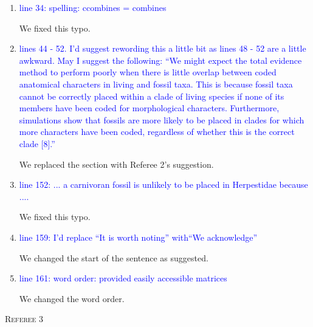 \documentclass[12pt,letterpaper]{article}
\renewcommand{\section}[1]{%
\bigskip
\begin{center}
\begin{Large}
\normalfont\scshape #1
\medskip
\end{Large}
\end{center}}
\begin{document}
\begin{enumerate}
\item{\textcolor{blue}{line 34: spelling: ccombines = combines}}

We fixed this typo.

\item{\textcolor{blue}{lines 44 - 52. I'd suggest rewording this a little bit as lines 48 - 52 are a little awkward. May I suggest the following:
``We might expect the total evidence method to perform poorly when there is little overlap between coded anatomical characters in living and fossil taxa. This is because fossil taxa cannot be correctly placed within a clade of living species if none of its members have been coded for morphological characters. Furthermore, simulations show that fossils are more likely to be placed in clades for which more characters have been coded, regardless of whether this is the correct clade [8].''}}

We replaced the section with Referee 2's suggestion.

\item{\textcolor{blue}{line 152: ... a carnivoran fossil is unlikely to be placed in Herpestidae because ....}}

We fixed this typo.

\item{\textcolor{blue}{line 159: I'd replace ``It is worth noting'' with``We acknowledge''}}

We changed the start of the sentence as suggested.

\item{\textcolor{blue}{line 161: word order: provided easily accessible matrices}}

We changed the word order.

\end{enumerate}


\section{Referee 3}
\end{document}
